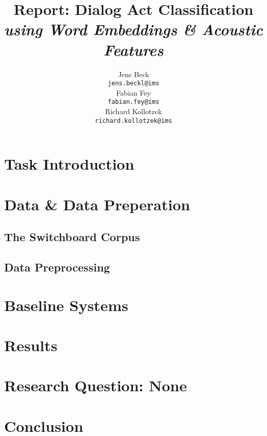 \documentclass[11pt,a4paper]{article}
\title{Report: Dialog Act Classification\\\textit{using Word Embeddings \& Acoustic Features}}
\author{Jens Beck \\
  {\tt jens.beckl@ims} \\\And
  Fabian Fey \\
  {\tt fabian.fey@ims} \\\And
  Richard Kollotzek \\
  {\tt richard.kollotzek@ims} \\}
\date{}
\begin{document}
\maketitle

\begin{abstract}
\lipsum[2]
\end{abstract}

\section{Task Introduction}
\lipsum[5-7]

\section{Data \& Data Preperation}

	\subsection{The Switchboard Corpus}

	\subsection{Data Preprocessing}

\section{Baseline Systems}

\section{Results}

\section{Research Question: None}

\section{Conclusion}

%
%

%
%
%
%
\end{document}
